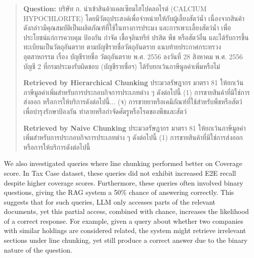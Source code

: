 \begin{quote}
    \begin{thai}
    \textbf{Question: } บริษัท ก. นำเข้าสินค้าแคลเซียมไฮโปคลอไรต์ (CALCIUM HYPOCHLORITE) โดยมีวัตถุประสงค์เพื่อจำหน่ายให้กับผู้เลี้ยงสัตว์น้ำ เนื่องจากสินค้าดังกล่าวมีคุณสมบัติเป็นผลิตภัณฑ์ที่ใช้ในทางการประมง และการเพาะเลี้ยงสัตว์น้ำ เพื่อประโยชน์แก่การควบคุม ป้องกัน กำจัด เชื้อจุลินทรีย์ ปรสิต พืช หรือสัตว์อื่น และได้รับการขึ้นทะเบียนเป็นวัตถุอันตราย ตามบัญชีรายชื่อวัตถุอันตราย แนบท้ายประกาศกระทรวงอุตสาหกรรม เรื่อง บัญชีรายชื่อ วัตถุอันตราย พ.ศ. 2556 ลงวันที่ 28 สิงหาคม พ.ศ. 2556 บัญชี 2 ที่กรมประมงรับผิดชอบ (บัญชีรายชื่อฯ) ได้รับยกเว้นภาษีมูลค่าเพิ่มหรือไม่ 
    
        \textbf{Retrieved by Hierarchical Chunking} ประมวลรัษฎากร มาตรา 81 ให้ยกเว้นภาษีมูลค่าเพิ่มสำหรับการประกอบกิจการประเภทต่าง ๆ ดังต่อไปนี้
(1) การขายสินค้าที่มิใช่การส่งออก หรือการให้บริการดังต่อไปนี้...
(จ) การขายยาหรือเคมีภัณฑ์ที่ใช้สำหรับพืชหรือสัตว์ เพื่อบำรุงรักษาป้องกัน ทำลายหรือกำจัดศัตรูหรือโรคของพืชและสัตว์
        
        \textbf{Retrieved by Naive Chunking} ประมวลรัษฎากร มาตรา 81 ให้ยกเว้นภาษีมูลค่าเพิ่มสำหรับการประกอบกิจการประเภทต่าง ๆ ดังต่อไปนี้
(1) การขายสินค้าที่มิใช่การส่งออก หรือการให้บริการดังต่อไปนี้           
        \end{thai}
    \end{quote}



We also investigated queries where line chunking performed better on Coverage score. In Tax Case dataset, these queries did not exhibit increased E2E recall despite higher coverage scores. Furthermore, these queries often involved binary questions, giving the RAG system a 50\% chance of answering correctly. This suggests that for such queries, LLM only accesses parts of the relevant documents, yet this partial access, combined with chance, increases the likelihood of a correct response. For example, given a query about whether two companies with similar holdings are considered related, the system might retrieve irrelevant sections under line chunking, yet still produce a correct answer due to the binary nature of the question.


